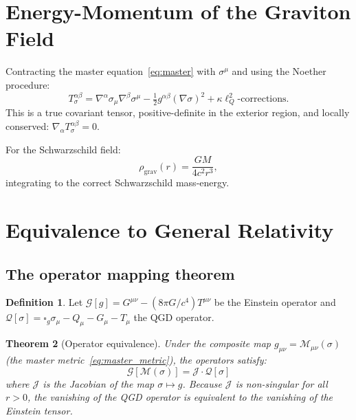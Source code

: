\documentclass[11pt,a4paper]{article}
\theoremstyle{plain}
\newtheorem{theorem}{Theorem}[section]
\theoremstyle{definition}
\newtheorem{definition}[theorem]{Definition}
\theoremstyle{remark}
\newcommand{\lQ}{\ell_Q}
\newcommand{\boxg}{\square_g}
\newcommand{\half}{\tfrac{1}{2}}
\begin{document}
\section{Energy-Momentum of the Graviton Field}
\label{sec:energy}

Contracting the master equation~\eqref{eq:master} with $\sigma^\mu$ and using the
Noether procedure:
\begin{equation}
  T_\sigma^{\alpha\beta}
  = \nabla^\alpha\sigma_\mu\nabla^\beta\sigma^\mu
    - \half g^{\alpha\beta}(\nabla\sigma)^2
    + \kappa\lQ^2\text{-corrections}.
  \label{eq:Tsig}
\end{equation}
This is a true covariant tensor, positive-definite in the exterior region, and
locally conserved: $\nabla_\alpha T_\sigma^{\alpha\beta} = 0$.

For the Schwarzschild field:
\begin{equation}
  \rho_{\mathrm{grav}}(r) = \frac{GM}{4c^2r^3},
  \label{eq:rhograv}
\end{equation}
integrating to the correct Schwarzschild mass-energy.

\section{Equivalence to General Relativity}
\label{sec:equivalence}

\subsection{The operator mapping theorem}

\begin{definition}
Let $\mathcal{G}[g] = G^{\mu\nu} - (8\pi G/c^4)T^{\mu\nu}$ be the Einstein
operator and $\mathcal{Q}[\sigma] = \boxg\sigma_\mu - Q_\mu - G_\mu - T_\mu$
the QGD operator.
\end{definition}

\begin{theorem}[Operator equivalence]
\label{thm:equiv}
Under the composite map $g_{\mu\nu} = \mathcal{M}_{\mu\nu}(\sigma)$
(the master metric~\eqref{eq:master_metric}), the operators satisfy:
\begin{equation}
  \mathcal{G}[\mathcal{M}(\sigma)] = \mathcal{J}\cdot\mathcal{Q}[\sigma]
  \label{eq:op_equiv}
\end{equation}
where $\mathcal{J}$ is the Jacobian of the map $\sigma \mapsto g$.
Because $\mathcal{J}$ is non-singular for all $r > 0$, the vanishing of
the QGD operator is equivalent to the vanishing of the Einstein tensor.
\end{theorem}
\end{document}
